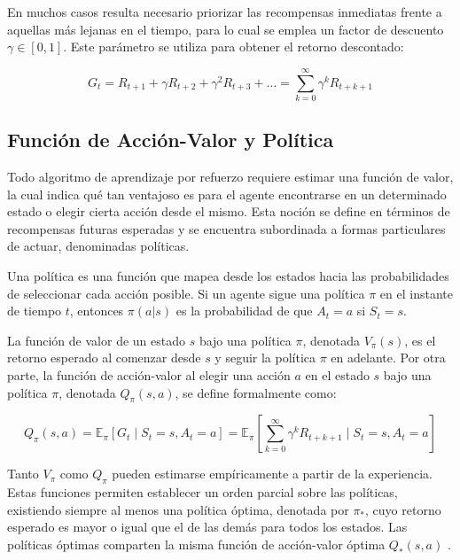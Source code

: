 En muchos casos resulta necesario priorizar las recompensas inmediatas frente a aquellas más lejanas en el tiempo, para lo cual se emplea un factor de descuento $\gamma \in [0, 1]$. Este parámetro se utiliza para obtener el retorno descontado:

\begin{equation}
G_t = R_{t+1} + \gamma R_{t+2} + \gamma^2 R_{t+3} + \ldots = \sum_{k=0}^{\infty} \gamma^k R_{t+k+1}
\end{equation}

\subsection{Función de Acción-Valor y Política}

Todo algoritmo de aprendizaje por refuerzo requiere estimar una función de valor, la cual indica qué tan ventajoso es para el agente encontrarse en un determinado estado o elegir cierta acción desde el mismo. Esta noción se define en términos de recompensas futuras esperadas y se encuentra subordinada a formas particulares de actuar, denominadas políticas.

Una política es una función que mapea desde los estados hacia las probabilidades de seleccionar cada acción posible. Si un agente sigue una política $\pi$ en el instante de tiempo $t$, entonces $\pi(a|s)$ es la probabilidad de que $A_t=a$ si $S_t=s$.

La función de valor de un estado $s$ bajo una política $\pi$, denotada $V_{\pi}(s)$, es el retorno esperado al comenzar desde $s$ y seguir la política $\pi$ en adelante. Por otra parte, la función de acción-valor al elegir una acción $a$ en el estado $s$ bajo una política $\pi$, denotada $Q_{\pi}(s,a)$, se define formalmente como:

\begin{equation}
Q_{\pi}(s,a) = \mathbb{E}_{\pi} \left[ G_t \mid S_t = s, A_t = a \right] = \mathbb{E}_{\pi} \left[ \sum_{k=0}^{\infty} \gamma^k R_{t+k+1} \mid S_t = s, A_t = a \right]
\end{equation}

Tanto $V_{\pi}$ como $Q_{\pi}$ pueden estimarse empíricamente a partir de la experiencia. Estas funciones permiten establecer un orden parcial sobre las políticas, existiendo siempre al menos una política óptima, denotada por $\pi_{*}$, cuyo retorno esperado es mayor o igual que el de las demás para todos los estados. Las políticas óptimas comparten la misma función de acción-valor óptima $Q_{*}(s,a)$ \cite{suttonRL}.

